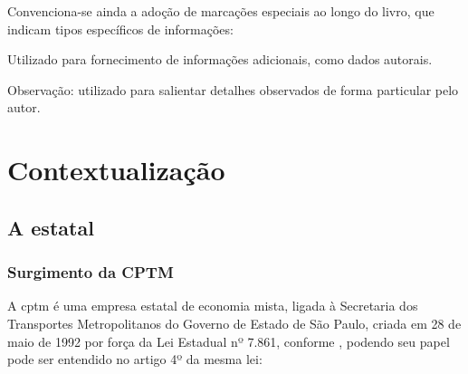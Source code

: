 \documentclass[11pt,fleqn]{book} %
\begin{document}
Convenciona-se ainda a adoção de marcações especiais ao longo do livro, que indicam tipos específicos de informações:

\begin{info}
	Utilizado para fornecimento de informações adicionais, como dados autorais.
\end{info}

\begin{obs}
	Observação: utilizado para salientar detalhes observados de forma particular pelo autor.
\end{obs}


\part{Contextualização}

\chapter{A estatal}

\section{Surgimento da CPTM}

A \glsdesc*{cptm} é uma empresa estatal de economia mista, ligada à Secretaria dos Transportes Metropolitanos do Governo de Estado de São Paulo, criada em 28 de maio de 1992 por força da Lei Estadual nº 7.861, conforme \cite{sitecptm1}, podendo seu papel pode ser entendido no artigo 4º da mesma lei:
	
\end{document}
